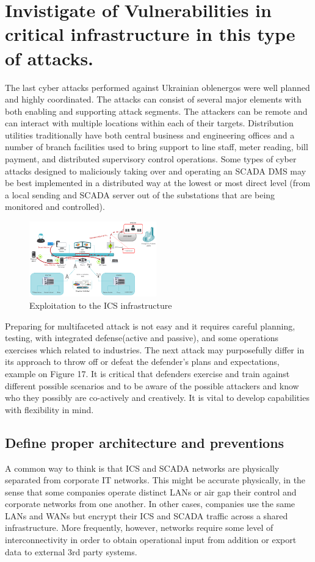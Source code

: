 \documentclass[conference]{IEEEtran}
\begin{document}
\section{Invistigate of Vulnerabilities in critical infrastructure in this type of attacks.}
\label{sec:CM}
The last cyber attacks performed against Ukrainian oblenergos were well planned and highly coordinated. The attacks can consist of several major elements with both enabling and supporting attack segments. The attackers can be remote and can interact with multiple locations within each of their targets. Distribution utilities traditionally have both central business and engineering offices and a number of branch facilities used to bring support to line staff, meter reading, bill payment, and distributed supervisory control operations. Some types of cyber attacks designed to maliciously taking over and operating an SCADA DMS may be best implemented in a distributed way at the lowest or most direct level (from a local sending and SCADA server out of the substations that are being monitored and controlled).
\begin{figure}[!htb]
	\includegraphics[width=0.49\textwidth]{images/infiltration2.png}
	\caption{Exploitation to the ICS infrastructure }
	\label{fig:fb}
\end{figure}

Preparing for  multifaceted
attack is not easy and it requires careful planning, testing, with integrated defense(active and passive), and some operations exercises which related to industries.
The next attack may purposefully differ in its approach to throw off or defeat the defender’s plans and expectations, example on Figure 17. It is critical that defenders exercise and train against different possible scenarios and to be aware of the possible attackers and know who they possibly are co-actively and creatively. It is vital to develop capabilities with flexibility in mind.


\subsection{Define proper architecture and preventions}
A common way to think is that ICS and SCADA networks are physically separated from corporate IT networks. This might be accurate physically, in the sense that some companies operate distinct LANs or air gap their control and corporate networks  from one another. In other cases, companies use the same LANs and WANs but encrypt their ICS and SCADA traffic across a shared infrastructure. More frequently, however, networks require some level of interconnectivity in order to obtain operational input from addition or export data to external 3rd party systems. 
\end{document}
